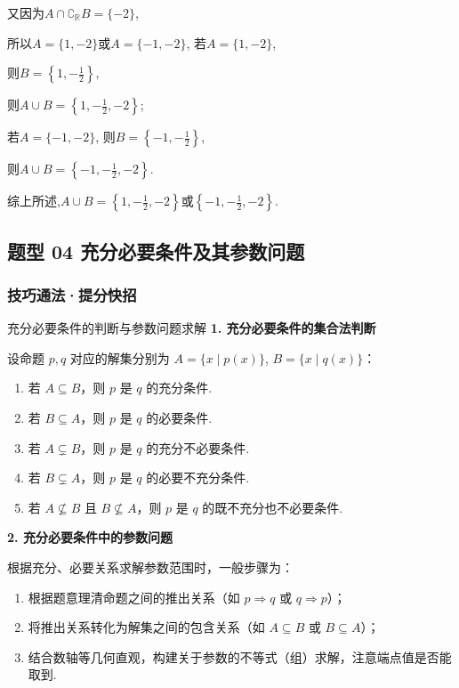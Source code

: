 \documentclass[11pt,a4paper]{ctexart}
\begin{document}
又因为\(A \cap \complement_{\mathbb{R}}B = \{-2\}\),

所以\(A = \{1, -2\}\)或\(A = \{-1, -2\}\), 若\(A = \{1, -2\}\),

则\(B = \left\{1, -\frac{1}{2}\right\}\),

则\(A \cup B = \left\{1, -\frac{1}{2}, -2\right\}\);

若\(A = \{-1, -2\}\), 则\(B = \left\{-1, -\frac{1}{2}\right\}\),

则\(A \cup B = \left\{-1, -\frac{1}{2}, -2\right\}\).

综上所述,\(A \cup B = \left\{1, -\frac{1}{2}, -2\right\}\)或\(\left\{-1, -\frac{1}{2}, -2\right\}\).\subsection{题型 04
充分必要条件及其参数问题}\label{ux9898ux578b-04-ux5145ux5206ux5fc5ux8981ux6761ux4ef6ux53caux5176ux53c2ux6570ux95eeux9898}

\subsubsection{技巧通法·提分快招}\label{ux6280ux5de7ux901aux6cd5ux63d0ux5206ux5febux62db-3}

\begin{methodbox}{充分必要条件的判断与参数问题求解}
  \textbf{1. 充分必要条件的集合法判断}
  
  设命题 $p, q$ 对应的解集分别为 $A=\{x \mid p(x)\}$, $B=\{x \mid q(x)\}$：

\begin{enumerate}[label=(\arabic*), leftmargin=*]
    \item 若 $A \subseteq B$，则 $p$ 是 $q$ 的充分条件.
    \item 若 $B \subseteq A$，则 $p$ 是 $q$ 的必要条件.
    \item 若 $A \subsetneq B$，则 $p$ 是 $q$ 的充分不必要条件.
    \item 若 $B \subsetneq A$，则 $p$ 是 $q$ 的必要不充分条件.
    \item 若 $A \not\subseteq B$ 且 $B \not\subseteq A$，则 $p$ 是 $q$ 的既不充分也不必要条件.
  \end{enumerate}

  \vspace{0.5em}
  \textbf{2. 充分必要条件中的参数问题}
  
  根据充分、必要关系求解参数范围时，一般步骤为：
  

\begin{enumerate}[label=(\arabic*), leftmargin=*]
    \item 根据题意理清命题之间的推出关系（如 $p \Rightarrow q$ 或 $q \Rightarrow p$）；
    \item 将推出关系转化为解集之间的包含关系（如 $A \subseteq B$ 或 $B \subseteq A$）；
    \item 结合数轴等几何直观，构建关于参数的不等式（组）求解，注意端点值是否能取到.
  \end{enumerate}
\end{methodbox}
\end{document}
